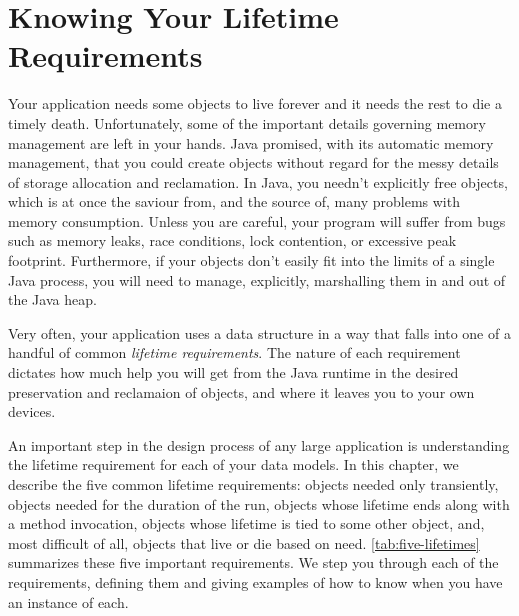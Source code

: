 \chapter{Knowing Your Lifetime Requirements}

Your application needs some objects to live forever and it needs the rest to die
a timely death. Unfortunately, some of the important details governing memory
management are left in your hands. Java promised, with its automatic memory
management, that you could create objects without regard for the messy details of
storage allocation and reclamation. In Java, you needn't explicitly free objects,
which is at once the saviour from, and the source of, many problems with memory
consumption. Unless you are careful, your program will suffer from bugs such as
memory leaks, race conditions, lock contention, or excessive
peak footprint. Furthermore, if your objects don't easily fit into the limits of
a single Java process, you will need to manage, explicitly, marshalling them in
and out of the Java heap.

Very often, your application uses a data structure in a way that falls into one
of a handful of common \emph{lifetime requirements}. The
nature of each requirement dictates how much help you will get from the Java runtime
in the desired preservation and reclamaion of objects, and where it leaves you to
your own devices. 

An important step in the design process of any large application is understanding
the lifetime requirement for each of your data models. In this chapter, we
describe the five common lifetime requirements: objects needed only transiently,
objects needed for the duration of the run, objects whose lifetime ends along
with a method invocation, objects whose lifetime is tied to some other object,
and, most difficult of all, objects that live or die based on need.
\autoref{tab:five-lifetimes} summarizes these five important requirements. We step
you through each of the requirements, defining them and giving examples of how to
know when you have an instance of each.

